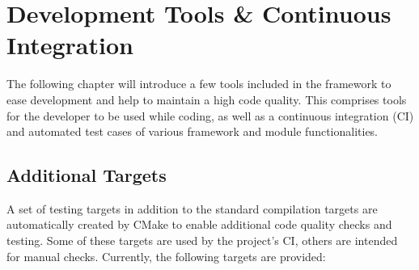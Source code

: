 \chapter{Development Tools \& Continuous Integration}
\label{ch:testing}

The following chapter will introduce a few tools included in the framework to ease development and help to maintain a high code quality. This comprises tools for the developer to be used while coding, as well as a continuous integration (CI) and automated test cases of various framework and module functionalities.

\section{Additional Targets}
\label{sec:targets}

A set of testing targets in addition to the standard compilation targets are automatically created by CMake to enable additional code quality checks and testing.
Some of these targets are used by the project's CI, others are intended for manual checks.
Currently, the following targets are provided:

